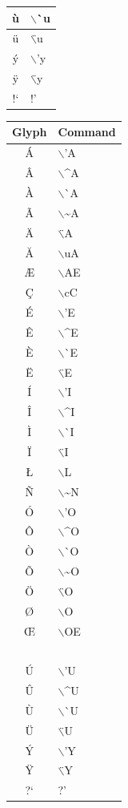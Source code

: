 \begin{center}
\begin{tabular}{|c|l|}
    \`{u} & $\backslash$\`{}u\\ \hline
    \"{u} & $\backslash$\"{}u\\ \hline
    \'{y} & $\backslash$'{}y\\ \hline
    \"{y} & $\backslash$\"{}y\\ \hline
    !` & !'\\ \hline
  \end{tabular}
  \begin{tabular}{|c|l|} \hline
    \textbf{Glyph} & \textbf{Command}\\ \hline
    \'{A} & $\backslash$'{}A\\ \hline
    \^{A} & $\backslash$\^{}A\\ \hline
    \`{A} & $\backslash$\`{}A\\ \hline
    \~{A} & $\backslash$\~{}A\\ \hline
    \"{A} & $\backslash$\"{}A\\ \hline
    \u{A} & $\backslash$uA\\ \hline
    \AE & $\backslash$AE\\ \hline
    \c{C} & $\backslash$cC\\ \hline
    \'{E} & $\backslash$'{}E\\ \hline
    \^{E} & $\backslash$\^{}E\\ \hline
    \`{E} & $\backslash$\`{}E\\ \hline
    \"{E} & $\backslash$\"{}E\\ \hline
    \'{I} & $\backslash$'{}I\\ \hline
    \^{I} & $\backslash$\^{}I\\ \hline
    \`{I} & $\backslash$\`{}I\\ \hline
    \"{I} & $\backslash$\"{}I\\ \hline
    \L & $\backslash$L\\ \hline
    \~{N} & $\backslash$\~{}N\\ \hline
    \'{O} & $\backslash$'{}O\\ \hline
    \^{O} & $\backslash$\^{}O\\ \hline
    \`{O} & $\backslash$\`{}O\\ \hline
    \~{O} & $\backslash$\~{}O\\ \hline
    \"{O} & $\backslash$\"{}O\\ \hline
    \O & $\backslash$O\\ \hline
    \OE & $\backslash$OE\\ \hline
    $ $ & $ $\\ \hline
    \'{U} & $\backslash$'{}U\\ \hline
    \^{U} & $\backslash$\^{}U\\ \hline
    \`{U} & $\backslash$\`{}U\\ \hline
    \"{U} & $\backslash$\"{}U\\ \hline
    \'{Y} & $\backslash$'{}Y\\ \hline
    \"{Y} & $\backslash$\"{}Y\\ \hline
    ?` & ?'\\ \hline
  \end{tabular}
\end{center}

